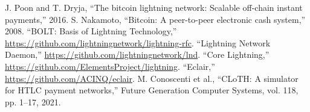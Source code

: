 \documentclass[conference]{IEEEtran}
\begin{document}
\begin{thebibliography}{00}
	 J. Poon and T. Dryja, ``The bitcoin lightning network: Scalable off-chain instant payments,'' 2016.
	 S. Nakamoto, ``Bitcoin: A peer-to-peer electronic cash system,'' 2008.
	 ``BOLT: Basis of Lightning Technology,'' \url{https://github.com/lightningnetwork/lightning-rfc}.
	 ``Lightning Network Daemon,'' \url{https://github.com/lightningnetwork/lnd}.
	 ``Core Lightning,'' \url{https://github.com/ElementsProject/lightning}.
	 ``Eclair,'' \url{https://github.com/ACINQ/eclair}.
	 M. Conoscenti et al., ``CLoTH: A simulator for HTLC payment networks,'' Future Generation Computer Systems, vol. 118, pp. 1--17, 2021.
\end{thebibliography}
\end{document}
